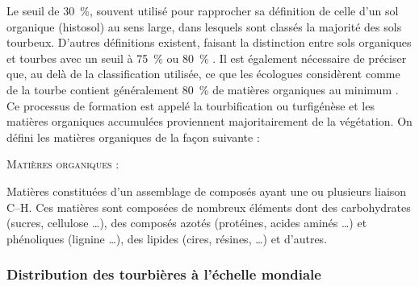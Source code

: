 Le seuil de \SI{30}{\percent}, souvent utilisé pour rapprocher sa définition de celle d'un sol organique (histosol) au sens large, dans lesquels sont classés la majorité des sols tourbeux.
D'autres définitions existent, faisant la distinction entre sols organiques et tourbes avec un seuil à \SI{75}{\percent} \citep{andrejko1983} ou \SI{80}{\percent} \citep{landva1983}.
Il est également nécessaire de préciser que, au delà de la classification utilisée, ce que les écologues considèrent comme de la tourbe contient généralement \SI{80}{\percent} de matières organiques au minimum \citep{rydin2013b}.
Ce processus de formation est appelé la tourbification ou turfigénèse et les matières organiques accumulées proviennent majoritairement de la végétation.
On défini les matières organiques de la façon suivante : 
\begin{pdef}
\textsc{Matières organiques} :

Matières constituées d'un assemblage de composés ayant une ou plusieurs liaison C--H.
Ces matières sont composées de nombreux éléments dont des carbohydrates (sucres, cellulose \dots), des composés azotés (protéines, acides aminés \dots) et phénoliques (lignine \dots), des lipides (cires, résines, \dots) et d'autres\footnotemark.

\end{pdef}


\subsubsection{Distribution des tourbières à l'échelle mondiale}

